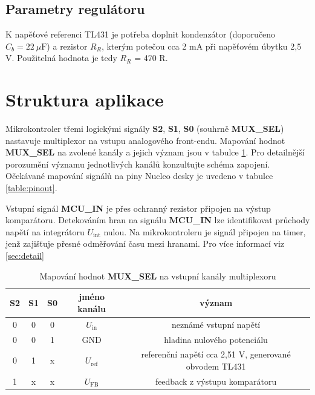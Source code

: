 \documentclass[twoside]{article}
\begin{document}
\subsection{Parametry regulátoru}

K napěťové referenci TL431 je potřeba doplnit kondenzátor (doporučeno $C_b = 22~\mu \text{F}$) a rezistor $R_R$, kterým
potečou cca 2 mA při napěťovém úbytku 2,5 V. Použitelná hodnota je tedy $R_R$ = 470 R.

\section{Struktura aplikace}

Mikrokontroler třemi logickými signály \textbf{S2}, \textbf{S1}, \textbf{S0} (souhrně \textbf{MUX\_SEL}) nastavuje
multiplexor na vstupu analogového front-endu. Mapování hodnot \textbf{MUX\_SEL} na zvolené kanály
a jejich význam jsou v tabulce \ref{table:mux}. Pro detailnější porozumění významu jednotlivých kanálů
konzultujte schéma zapojení. Očekávané mapování signálů na piny Nucleo desky je uvedeno v tabulce \ref{table:pinout}.

Vstupní signál \textbf{MCU\_IN} je přes ochranný rezistor připojen na výstup komparátoru.
Detekováním hran na signálu \textbf{MCU\_IN} lze identifikovat průchody napětí na integrátoru $U_{\text{int}}$ nulou.
Na mikrokontroleru je signál připojen na timer, jenž zajišťuje přesné odměřování času mezi hranami.
Pro více informací viz \ref{sec:detail}

\begin{table}[htbp]
    \centering
    \begin{tabular}{c|c|c|c|c}
        \textbf{S2} & \textbf{S1} & \textbf{S0} & jméno kanálu & význam\\ \hline
        0 & 0 & 0 & $U_{\text{in}}$ & neznámé vstupní napětí \\
        0 & 0 & 1 & GND & hladina nulového potenciálu \\
        0 & 1 & x & $U_{\text{ref}}$ & referenční napětí cca 2,51 V, generované obvodem TL431\\
        1 & x & x & $U_{\text{FB}}$ & feedback z výstupu komparátoru
    \end{tabular}
    \caption{Mapování hodnot \textbf{MUX\_SEL} na vstupní kanály multiplexoru}
    \label{table:mux}
\end{table}
\end{document}
